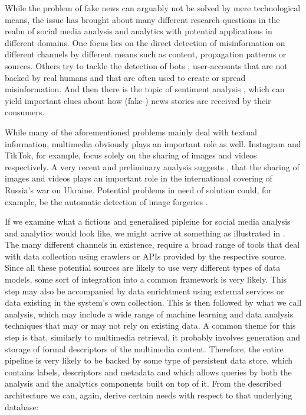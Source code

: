 While the problem of fake news can arguably not be solved by mere technological means, the issue has brought about many different research questions in the realm of social media analysis and analytics with potential applications in different domains. One focus lies on the direct detection of misinformation on different channels \cite{Zhou:2020Survey} by different means such as content, propagation patterns or sources. Others try to tackle the detection of bots \cite{Cresci:2020Decade}, user-accounts that are not backed by real humans and that are often used to create or spread misinformation. And then there is the topic of sentiment analysis \cite{Yue:2019Survey}, which can yield important clues about how (fake-) news stories are received by their consumers.

While many of the aforementioned problems mainly deal with textual information, multimedia obviously plays an important role as well. Instagram and TikTok, for example, focus solely on the sharing of images and videos respectively. A very recent and preliminary analysis suggests \cite{Ciuriak:2022Role}, that the sharing of images and videos plays an important role in the international covering of Russia's war on Ukraine. Potential problems in need of solution could, for example, be the automatic detection of image forgeries \cite{Farid:2009Image}.

If we examine what a fictious and generalised pipleine for social media analysis and analytics would look like, we might arrive at something as illustrated in  \cite{Cui:2019Defend,Yang:2019XFake,Bagade:2020Kauwa}. The many different channels in existence, require a broad range of tools that deal with data collection using crawlers or APIs provided by the respective source. Since all these potential sources are likely to use very different types of data models, some sort of integration into a common framework is very likely. This step may also be accompanied by data enrichtment using external services or data existing in the system's own collection. This is then followed by what we call analysis, which may include a wide range of machine learning and data analysis techniques that may or may not rely on existing data. A common theme for this step is that, similarly to multimedia retrieval, it probably involves generation and storage of formal descriptors of the multimedia content. Therefore, the entire pipeline is very likely to be backed by some type of persistent data store, which contains labels, descriptors and metadata and which allows queries by both the analysis and the analytics components built on top of it. From the described architecture we can, again, derive certain needs with respect to that underlying database: 

